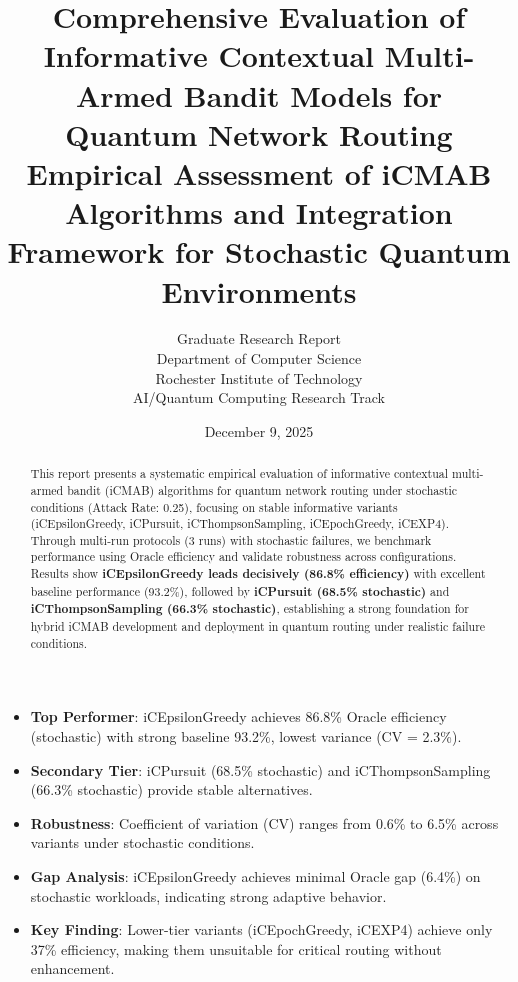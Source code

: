 \documentclass[12pt,a4paper]{article}
\title{\textbf{Comprehensive Evaluation of Informative Contextual Multi-Armed Bandit Models for Quantum Network Routing}\\
\large{Empirical Assessment of iCMAB Algorithms and Integration Framework for Stochastic Quantum Environments}}
\author{Graduate Research Report\\
Department of Computer Science\\
Rochester Institute of Technology\\
AI/Quantum Computing Research Track}
\date{December 9, 2025}
\newcommand{\primarytext}[1]{\textcolor{primaryblue}{\textbf{#1}}}
\newcommand{\secondarytext}[1]{\textcolor{secondaryblue}{\textbf{#1}}}
\newcommand{\success}[1]{\textcolor{accentgreen}{\textbf{#1}}}
\newcommand{\warning}[1]{\textcolor{warningred}{\textbf{#1}}}
\begin{document}
\maketitle

\begin{abstract}
This report presents a systematic empirical evaluation of informative contextual multi-armed bandit (iCMAB) algorithms for quantum network routing under stochastic conditions (Attack Rate: 0.25), focusing on stable informative variants (iCEpsilonGreedy, iCPursuit, iCThompsonSampling, iCEpochGreedy, iCEXP4). Through multi-run protocols (3 runs) with stochastic failures, we benchmark performance using Oracle efficiency and validate robustness across configurations. Results show \primarytext{iCEpsilonGreedy leads decisively (86.8\% efficiency)} with excellent baseline performance (93.2\%), followed by \secondarytext{iCPursuit (68.5\% stochastic)} and \success{iCThompsonSampling (66.3\% stochastic)}, establishing a strong foundation for hybrid iCMAB development and deployment in quantum routing under realistic failure conditions.
\end{abstract}

\newpage
\tableofcontents

\newpage

\begin{tcolorbox}[colback=highlightgray,colframe=primaryblue,title=\textbf{Executive Summary}]
\begin{itemize}
\item \primarytext{Top Performer}: iCEpsilonGreedy achieves 86.8\% Oracle efficiency (stochastic) with strong baseline 93.2\%, lowest variance (CV = 2.3\%).
\item \secondarytext{Secondary Tier}: iCPursuit (68.5\% stochastic) and iCThompsonSampling (66.3\% stochastic) provide stable alternatives.
\item \success{Robustness}: Coefficient of variation (CV) ranges from 0.6\% to 6.5\% across variants under stochastic conditions.
\item \primarytext{Gap Analysis}: iCEpsilonGreedy achieves minimal Oracle gap (6.4\%) on stochastic workloads, indicating strong adaptive behavior.
\item \warning{Key Finding}: Lower-tier variants (iCEpochGreedy, iCEXP4) achieve only 37\% efficiency, making them unsuitable for critical routing without enhancement.
\end{itemize}
\end{tcolorbox}
\end{document}
